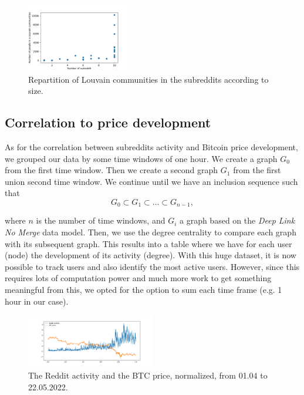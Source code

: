 \begin{figure}[ht!]
    \centering
    \includegraphics[width=0.4\textwidth]{figures/communities_repartition_by_size.pdf}
    \caption{Repartition of Louvain communities in the subreddits according to size.}
    \label{fig:louvainsizerepartition}
\end{figure}

\subsection{Correlation to price development}
As for the correlation between subreddits activity and Bitcoin price development, we grouped our data by some time windows of one hour. We create a graph $G_0$ from the first time window. Then we create a second graph $G_1$ from the first union second time window. We continue until we have an inclusion sequence such that 
$$ G_0 \subset G_1 \subset  ... \subset G_{n-1},$$

where $n$ is the number of time windows, and $G_i$ a graph based on the \textit{Deep Link No Merge} data model.
Then, we use the degree centrality to compare each graph with its subsequent graph. This results into a table where we have for each user (node) the development of its activity (degree). With this huge dataset, it is now possible to track users and also identify the most active users. However, since this requires lots of computation power and much more work to get something meaningful from this, we opted for the option to sum each time frame (e.g. 1 hour in our case). 

\begin{figure}[ht!]
    \centering
    \includegraphics[width=0.5\textwidth]{figures/activity_x_price.pdf}
    \caption{The Reddit activity and the BTC price, normalized, from 01.04 to 22.05.2022.}
\end{figure}


